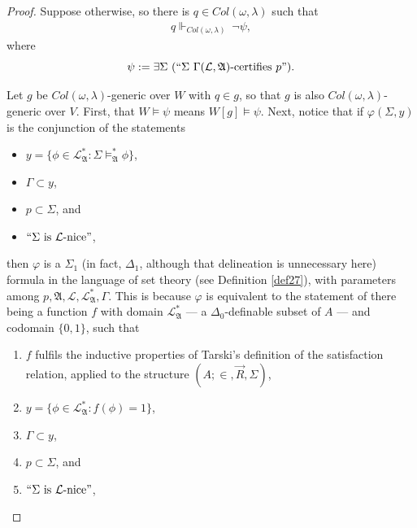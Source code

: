 \documentclass[12pt, twoside]{memoir}
\numberwithin{equation}{section}
\theoremstyle{definition}
\theoremstyle{remark}
\theoremstyle{definition}
\theoremstyle{definition}
\theoremstyle{definition}
\theoremstyle{remark}
\begin{document}
\begin{proof}
Suppose otherwise, so there is $q \in Col(\omega, \lambda)$ such that
\begin{align}
    \label{eq10} q \Vdash_{Col(\omega, \lambda)} \ \neg \psi,
\end{align}
where $$\psi := \exists \Sigma \ (``\Sigma \ \Gamma(\mathcal{L}, \mathfrak{A}) \text{-certifies } p").$$

Let $g$ be $Col(\omega, \lambda)$-generic over $W$ with $q \in g$, so that $g$ is also $Col(\omega, \lambda)$-generic over $V$. First, that $W \models \psi$ means $W[g] \models \psi$. Next, notice that if $\varphi(\Sigma, y)$ is the conjunction of the statements
\begin{itemize}
    \item $y = \{\phi \in \mathcal{L}^*_{\mathfrak{A}} : \Sigma \models^*_{\mathfrak{A}} \phi\}$,
    \item $\Gamma \subset y$, 
    \item $p \subset \Sigma$, and
    \item $``\Sigma \text{ is } \mathcal{L}\text{-nice}"$, 
\end{itemize}
then $\varphi$ is a $\Sigma_1$ (in fact, $\Delta_1$, although that delineation is unnecessary here) formula in the language of set theory (see Definition \ref{def27}), with parameters among $p, \mathfrak{A}, \mathcal{L}, \mathcal{L}^*_{\mathfrak{A}}, \Gamma$. This is because $\varphi$ is equivalent to the statement of there being a function $f$ with domain $\mathcal{L}^*_{\mathfrak{A}}$ --- a $\Delta_0$-definable subset of $A$ --- and codomain $\{0, 1\}$, such that 
\begin{enumerate}[label=(\alph*)]
    \item $f$ fulfils the inductive properties of Tarski's definition of the satisfaction relation, applied to the structure $(A; \in, \Vec{R}, \Sigma)$,
    \item $y = \{\phi \in \mathcal{L}^*_{\mathfrak{A}} : f(\phi) = 1\}$, 
    \item $\Gamma \subset y$,
    \item $p \subset \Sigma$, and
    \item $``\Sigma \text{ is } \mathcal{L}\text{-nice}"$,
\end{enumerate}

\end{proof}
\end{document}
